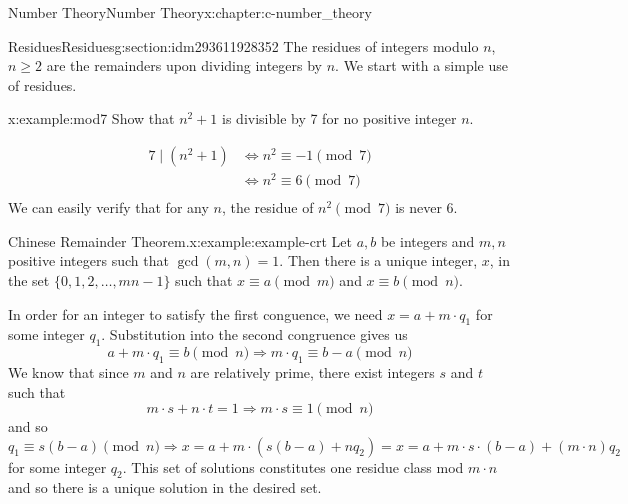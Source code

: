 \documentclass[twoside,10pt,]{book}
\numberwithin{equation}{section}
\begin{document}
\begin{chapterptx}{Number Theory}{}{Number Theory}{}{}{x:chapter:c-number_theory}
%
\begin{sectionptx}{Residues}{}{Residues}{}{}{g:section:idm293611928352}
The residues of integers modulo \(n\), \(n \geq 2\) are the remainders upon dividing integers by \(n\).  We start with a simple use of residues.%
\begin{example}{}{x:example:mod7}%
Show that \(n^2+ 1\) is divisible by 7 for no positive integer \(n\).%
\par
%
\begin{equation*}
\begin{split}
7 \mid (n^2+1) & \Leftrightarrow n^2 \equiv -1\pmod{7}\\
& \Leftrightarrow n^2 \equiv  6\pmod{7}\\
\end{split}
\end{equation*}
We can easily verify that for any \(n\), the residue of \(n^2\pmod{7}\) is never 6.%
\end{example}
\begin{example}{Chinese Remainder Theorem.}{x:example:example-crt}%
%
Let \(a, b\) be integers and \(m, n\) positive integers such that \(\gcd (m,n)=1\). Then there is a unique integer, \(x\), in the set \(\{0,1,2,\ldots , m n -1\}\) such that \(x\equiv a \pmod{m}\) and \(x\equiv b\pmod{n}\).%
\par
In order for an integer to satisfy the first conguence, we need \(x = a + m\cdot q_1\) for some integer \(q_1\).  Substitution into the second congruence gives us%
\begin{equation*}
a + m\cdot q_1\equiv b \pmod{n} \Rightarrow  m\cdot q_1\equiv b-a \pmod{n}
\end{equation*}
We know that since \(m\) and \(n\) are relatively prime, there exist integers \(s\) and \(t\) such that%
\begin{equation*}
m \cdot s + n \cdot t = 1  \Rightarrow   m \cdot s \equiv 1 \pmod{n}
\end{equation*}
and so%
\begin{equation*}
q_1\equiv s(b-a) \pmod{n}  \Rightarrow   x = a + m\cdot (s(b-a)+ n q_2)= x = a + m\cdot s\cdot(b-a)+ (m\cdot n) q_2 
\end{equation*}
for some integer \(q_2\). This set of solutions constitutes one residue class mod \(m \cdot n\) and so there is a unique solution in the desired set.%
\end{example}
\end{sectionptx}
%
%
\typeout{************************************************}

\end{chapterptx}
\end{document}
